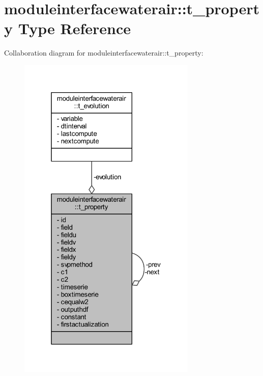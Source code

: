 \hypertarget{structmoduleinterfacewaterair_1_1t__property}{}\section{moduleinterfacewaterair\+:\+:t\+\_\+property Type Reference}
\label{structmoduleinterfacewaterair_1_1t__property}


Collaboration diagram for moduleinterfacewaterair\+:\+:t\+\_\+property\+:\nopagebreak
\begin{figure}[H]
\begin{center}
\leavevmode
\includegraphics[width=241pt]{structmoduleinterfacewaterair_1_1t__property__coll__graph}
\end{center}
\end{figure}
